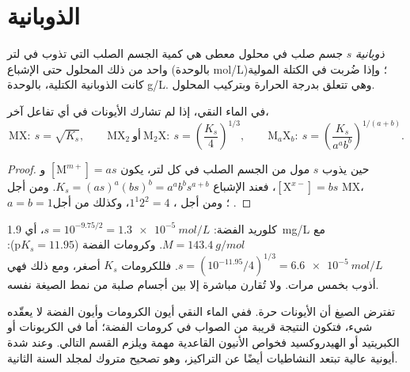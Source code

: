 \section{الذوبانية}

\begin{definition}[الذوبانية]\label{def:b1:precipitation:solubility}
\emph{ذوبانية} $s$ جسم صلب في محلول معطى
هي كمية الجسم الصلب التي تذوب في لتر واحد من ذلك المحلول
حتى الإشباع (بالوحدة \unit{mol/L})؛ وإذا ضُربت في الكتلة المولية كانت
الذوبانية الكتلية، بالوحدة \unit{g/L}. وهي تتعلق بدرجة الحرارة
وبتركيب المحلول.
\end{definition}

\begin{proposition}\label{prop:b1:precipitation:s-of-ks}
في الماء النقي، إذا لم تشارك الأيونات في أي تفاعل آخر،
\[
  \mathrm{MX}:\ s = \sqrt{K_s}, \qquad
  \mathrm{MX_2}\ \text{أو}\ \mathrm{M_2X}:\ s = \left(\frac{K_s}{4}\right)^{1/3},
  \qquad
  \mathrm{M}_a\mathrm{X}_b:\ s = \left(\frac{K_s}{a^a b^b}\right)^{1/(a+b)} .
\]
\end{proposition}

\begin{proof}
حين يذوب $s$ مول من الجسم الصلب في كل لتر، يكون $[\mathrm{M}^{m+}] = as$
و$[\mathrm{X}^{x-}] = bs$، فعند الإشباع $K_s = (as)^a(bs)^b =
a^a b^b s^{a+b}$. ومن أجل MX، $a = b = 1$؛ ومن أجل ، $1^1 2^2 = 4$،
وكذلك من أجل .
\end{proof}

\begin{example}\label{ex:b1:precipitation:agcl-ag2cro4}
كلوريد الفضة: $s = 10^{-9.75/2} = \qty{1.3e-5}{mol/L}$، أي
\qty{1.9}{mg/L} مع $M = \qty{143.4}{g/mol}$. وكرومات الفضة 
($\mathrm{p}K_s = 11.95$): $s = (10^{-11.95}/4)^{1/3} =
\qty{6.6e-5}{mol/L}$. فللكرومات $K_s$ أصغر، ومع ذلك فهي أذوب
بخمس مرات. ولا تُقارن  مباشرة إلا
بين أجسام صلبة من نمط الصيغة نفسه.
\end{example}

\begin{remark}
تفترض الصيغ أن الأيونات حرة. ففي الماء النقي أيون الكرومات
 وأيون الفضة لا يعقّده شيء، فتكون
النتيجة قريبة من الصواب في كرومات الفضة؛ أما في الكربونات أو
الكبريتيد أو الهيدروكسيد فخواص الأنيون القاعدية مهمة ويلزم
القسم التالي. وعند شدة أيونية عالية تبتعد النشاطيات أيضًا
عن التراكيز، وهو تصحيح متروك لمجلد السنة الثانية.
\end{remark}

